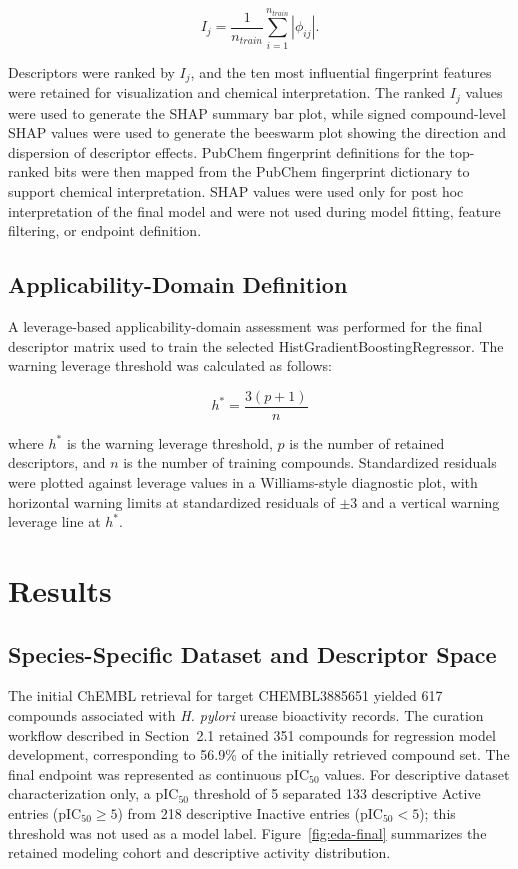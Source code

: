 \documentclass[11pt]{article}
\begin{document}
\begin{equation}
I_j = \frac{1}{n_{train}}\sum_{i=1}^{n_{train}} |\phi_{ij}|.
\end{equation}

Descriptors were ranked by $I_j$, and the ten most influential fingerprint features were retained for visualization and chemical interpretation. The ranked $I_j$ values were used to generate the SHAP summary bar plot, while signed compound-level SHAP values were used to generate the beeswarm plot showing the direction and dispersion of descriptor effects. PubChem fingerprint definitions for the top-ranked bits were then mapped from the PubChem fingerprint dictionary to support chemical interpretation. SHAP values were used only for post hoc interpretation of the final model and were not used during model fitting, feature filtering, or endpoint definition.

\subsection{Applicability-Domain Definition}

A leverage-based applicability-domain assessment was performed for the final descriptor matrix used to train the selected HistGradientBoostingRegressor. The warning leverage threshold was calculated as follows:

\begin{equation}
h^* = \frac{3(p+1)}{n}
\label{eq:warning-leverage}
\end{equation}

where $h^*$ is the warning leverage threshold, $p$ is the number of retained descriptors, and $n$ is the number of training compounds. Standardized residuals were plotted against leverage values in a Williams-style diagnostic plot, with horizontal warning limits at standardized residuals of $\pm 3$ and a vertical warning leverage line at $h^*$.

\section{Results}

\subsection{Species-Specific Dataset and Descriptor Space}

The initial ChEMBL retrieval for target CHEMBL3885651 yielded 617 compounds associated with \textit{H. pylori} urease bioactivity records. The curation workflow described in Section~2.1 retained 351 compounds for regression model development, corresponding to 56.9\% of the initially retrieved compound set. The final endpoint was represented as continuous pIC$_{50}$ values. For descriptive dataset characterization only, a pIC$_{50}$ threshold of 5 separated 133 descriptive Active entries (pIC$_{50} \geq 5$) from 218 descriptive Inactive entries (pIC$_{50} < 5$); this threshold was not used as a model label. Figure~\ref{fig:eda-final} summarizes the retained modeling cohort and descriptive activity distribution.
\end{document}
